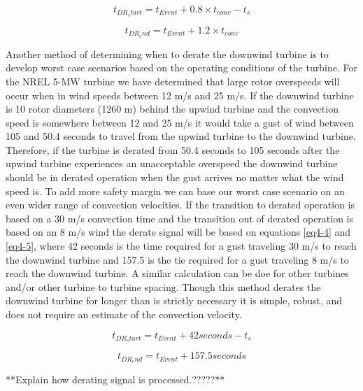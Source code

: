 \begin{equation}
	t_{DR_start} = t_{Event} + 0.8 \times t_{conv} - t_s \label{eq4-2}
\end{equation}

\begin{equation}
	t_{DR_end} = t_{Event} + 1.2 \times t_{conv} \label{eq4-3}
\end{equation}



Another method of determining when to derate the downwind turbine is to develop worst case scenarios based on the operating conditions of the turbine. For the NREL 5-MW turbine we have determined that large rotor overspeeds will occur when in wind speeds between 12 m/s and 25 m/s. If the downwind turbine is 10 rotor diameters (1260 m) behind the upwind turbine and the convection speed is somewhere between 12 and 25 m/s it would take a gust of wind between 105 and 50.4 seconds to travel from the upwind turbine to the downwind turbine. Therefore, if the turbine is derated from 50.4 seconds to 105 seconds after the upwind turbine experiences an unacceptable overspeed the downwind turbine should be in derated operation when the gust arrives no matter what the wind speed is. To add more safety margin we can base our worst case scenario on an even wider range of convection velocities. If the transition to derated operation is based on a 30 m/s convection time and the transition out of derated operation is based on an 8 m/s wind the derate signal will be based on equations \ref{eq4-4} and \ref{eq4-5}, where 42 seconds is the time required for a gust traveling 30 m/s to reach the downwind turbine and 157.5 is the tie required for a gust traveling 8 m/s to reach the downwind turbine.  A similar calculation can be doe for other turbines and/or other turbine to turbine spacing. Though this method derates the downwind turbine for longer than is strictly necessary it is simple, robust, and does not require an estimate of the convection velocity.

\begin{equation}
	t_{DR_start} = t_{Event} + 42 seconds - t_s \label{eq4-4}
\end{equation}

\begin{equation}
	t_{DR_end} = t_{Event} + 157.5 seconds \label{eq4-5}
\end{equation}






**Explain how derating signal is processed.?????**


